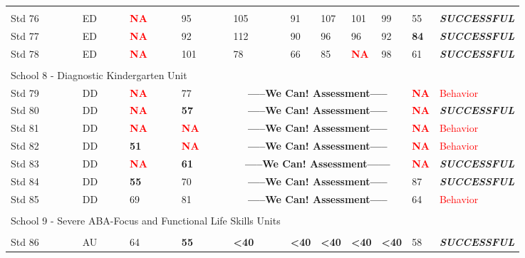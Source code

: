\documentclass[twoside]{article}
\begin{document}
\begin{tiny}
\begin{landscape}
\begin{longtable}{p{1.5cm}p{1.5cm}p{1.5cm}p{1.5cm}p{1.75cm}p{1.75cm}p{1.75cm}p{1.75cm}p{1.75cm}p{1.75cm}p{2.5cm}@{}}
\hline\\
Std 76 & ED & \textcolor{red}{\textbf{NA}} & 95 & 105 & 91 & 107 & 101 & 99 & 55 & \textbf{\textit{SUCCESSFUL}} \\
Std 77 & ED & \textcolor{red}{\textbf{NA}} & 92 & 112 & 90 & 96 & 96 & 92 & \textbf{84} & \textbf{\textit{SUCCESSFUL}} \\
Std 78 & ED & \textcolor{red}{\textbf{NA}} & 101 & 78 & 66 & 85 & \textcolor{red}{\textbf{NA}} & 98 & 61 & \textbf{\textit{SUCCESSFUL}}\\
\hline \\
%
\multicolumn {5}{l}{School 8 - Diagnostic Kindergarten Unit} & & & & & & \\
\cmidrule(lr){1-2}
Std 79 & DD & \textcolor{red}{\textbf{NA}} & 77 & \multicolumn{5}{c}{\textbf{-----We Can! Assessment-----}} & \textcolor{red}{\textbf{NA}} & \textcolor{red}{Behavior} \\
Std 80 & DD & \textcolor{red}{\textbf{NA}} & \textbf{57} & \multicolumn{5}{c}{\textbf{-----We Can! Assessment-----}} & \textcolor{red}{\textbf{NA}} & \textbf{\textit{SUCCESSFUL}}\\
Std 81 & DD & \textcolor{red}{\textbf{NA}} & \textcolor{red}{\textbf{NA}} & \multicolumn{5}{c}{\textbf{-----We Can! Assessment-----}} & \textcolor{red}{\textbf{NA}} & \textcolor{red}{Behavior} \\
Std 82 & DD & \textbf{51} & \textcolor{red}{\textbf{NA}} & \multicolumn{5}{c}{\textbf{-----We Can! Assessment-----}} & \textcolor{red}{\textbf{NA}} & \textcolor{red}{Behavior} \\
Std 83 & DD & \textcolor{red}{\textbf{NA}} & \textbf{61} & \multicolumn{5}{c}{\textbf{-----We Can! Assessment------}} & \textcolor{red}{\textbf{NA}} & \textbf{\textit{SUCCESSFUL}}\\
Std 84 & DD & \textbf{55} & 70 & \multicolumn{5}{c}{\textbf{-----We Can! Assessment-----}} & 87 & \textbf{\textit{SUCCESSFUL}}\\
Std 85 & DD & 69 & 81 & \multicolumn{5}{c}{\textbf{-----We Can! Assessment-----}} & 64 & \textcolor{red}{Behavior} \\
\hline\\
%
\multicolumn {5}{l}{School 9 - Severe ABA-Focus and Functional Life Skills Units} & & & & & &\\
\hline \\
\cmidrule(lr){1-2}
Std 86  & AU & 64 & \textbf{55} & \textbf{\textless40} & \textbf{\textless40} & \textbf{\textless40} & \textbf{\textless40} & \textbf{\textless40} & 58 & \textbf{\textit{SUCCESSFUL}}\\

\end{longtable}
\end{landscape}
\end{tiny}
\end{document}
